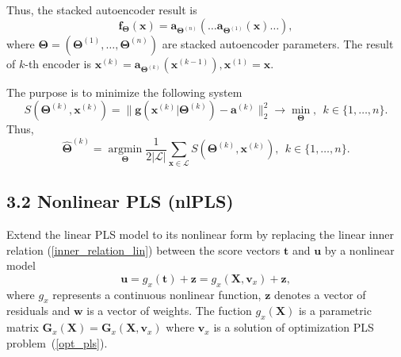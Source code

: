 \documentclass[12pt,twoside]{article}
\newcommand{\bz}{\mathbf{z}}
\newcommand{\bx}{\mathbf{x}}
\newcommand{\bw}{\mathbf{w}}
\newcommand{\bX}{\mathbf{X}}
\newcommand{\ba}{\mathbf{a}}
\newcommand{\bu}{\mathbf{u}}
\newcommand{\bt}{\mathbf{t}}
\newcommand{\bv}{\mathbf{v}}
\newcommand{\bG}{\mathbf{G}}
\begin{document}
	Thus, the stacked autoencoder result is
	\[
		\mathbf{f}_{\mathbf{\Theta}} (\bx) = \ba_{\mathbf{\Theta}^{(n)}} (\dots \ba_{\mathbf{\Theta}^{(1)}}(\bx)\dots),
	\]
	where $\mathbf{\Theta} = (\mathbf{\Theta}^{(1)}, \dots, \mathbf{\Theta}^{(n)})$ are stacked autoencoder parameters. The result of $k$-th encoder is $\bx^{(k)} = \ba_{\mathbf{\Theta}^{(k)}}(\bx^{(k - 1)}), \bx^{(1)} = \bx$.

	The purpose is to minimize the following system
	\begin{equation*}
		S(\mathbf{\Theta}^{(k)}, \mathbf{x}^{(k)}) = \|\mathbf{g}(\bx^{(k)} |\mathbf{\Theta}^{(k)}) - \ba^{(k)}\|^2_2 \to \min\limits_{\mathbf{\Theta}}, \ \ k \in \{1, \dots, n\}.
	\end{equation*}
	Thus,
	\begin{equation*}
	\hat{\mathbf{\Theta}}^{(k)} =  \mathop{\text{argmin}}\limits_{\mathbf{\Theta}} \dfrac{1}{2|\mathcal{L}|} \sum_{\mathbf{x} \in \mathcal{L}} S(\mathbf{\Theta}^{(k)}, \mathbf{x}^{(k)}), \ \ k \in \{1, \dots, n\}.
	\end{equation*}




\subsection{3.2 Nonlinear PLS (nlPLS)}
	
	Extend the linear PLS model to its nonlinear form by replacing the linear inner relation (\ref{inner_relation_lin}) between the score vectors $\bt$ and $\bu$ by a nonlinear model 
	\begin{equation}
	\label{inner_pls_nl}
		\bu = g_x(\bt) + \bz = g_x(\bX, \bv_x) + \bz,
	\end{equation}
	where $g_x$ represents a continuous nonlinear function, $\bz$ denotes a vector of residuals and $\bw$ is a vector of weights. The fuction $g_x(\bX)$ is a parametric matrix $\bG_x(\bX) = \bG_x(\bX, \bv_x)$ where $\bv_x$ is a solution of optimization PLS problem~(\ref{opt_pls}). 
\end{document}
